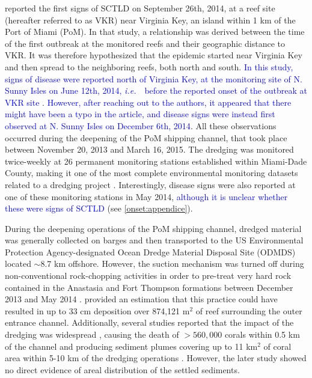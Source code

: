 \documentclass[preprint,12pt,authoryear]{elsarticle}
\newcommand{\ie}{{\it i.e.}\ }
\newcommand{\modif}[1]{\textcolor{blue}{#1}}
\begin{document}
\cite{precht2016unprecedented} reported the first signs of SCTLD on September 26th, 2014, at a reef site (hereafter referred to as VKR) near Virginia Key, an island within 1 km of the Port of Miami (PoM). In that study, a relationship was derived between the time of the first outbreak at the monitored reefs and their geographic distance to VKR. It was therefore hypothesized that the epidemic started near Virginia Key and then spread to the neighboring reefs, both north and south. \modif{In this study, signs of disease were reported north of Virginia Key, at the monitoring site of N. Sunny Isles on June 12th, 2014, \ie~before the reported onset of the outbreak at VKR site} \citep{precht2016unprecedented}. \modif{However, after reaching out to the authors, it appeared that there might have been a typo in the article, and disease signs were instead first observed at N. Sunny Isles on December 6th, 2014}. All these observations occurred during the deepening of the PoM shipping channel, that took place between November 20, 2013 and March 16, 2015. The dredging was monitored twice-weekly at 26 permanent monitoring stations established within Miami-Dade County, making it one of the most complete environmental monitoring datasets related to a dredging project \citep{gintert2019regional}. Interestingly, disease signs were also reported at one of these monitoring stations in May 2014, \modif{although it is unclear whether these were signs of SCTLD } (see \ref{onset:appendice}).

During the deepening operations of the PoM shipping channel, dredged material was generally collected on barges and then transported to the US Environmental Protection Agency-designated Ocean Dredge Material Disposal Site (ODMDS) located $\sim$8.7 km offshore. However, the suction mechanism was turned off during non-conventional rock-chopping activities in order to pre-treat very hard rock contained in the Anastasia and Fort Thompson formations between December 2013 and May 2014 \citep{miller2016detecting}. \cite{usace2017} provided an estimation that this practice could have resulted in up to 33 cm deposition over 874,121 m$^2$ of reef surrounding the outer entrance channel. Additionally, several studies reported that the impact of the dredging was widespread \citep{miller2016detecting}, causing the death of  $> 560,000$ corals within 0.5 km of the channel \citep{cunning2019extensive} and producing sediment plumes covering up to 11 km$^2$ of coral area within 5-10 km of the dredging operations \citep{barnes2015sediment}. However, the later study showed no direct evidence of areal distribution of the settled sediments. 
\end{document}
